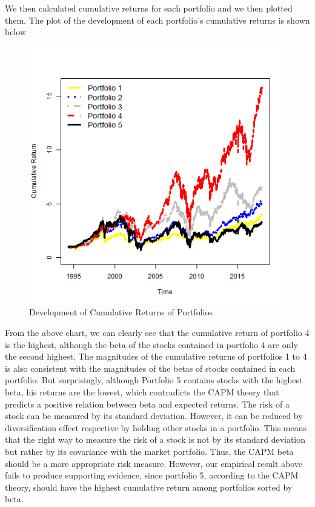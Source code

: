 \documentclass[12pt,a4paper]{article}
\begin{document}
\begin{justify}
We then calculated cumulative returns for each portfolio and we then plotted them. The plot of the development of each portfolio’s cumulative returns is shown below
\begin{figure}[H]
\centering
\includegraphics[width=1\textwidth,height=0.8\textwidth]{Cumulative Returns}
\caption{Development of Cumulative Returns of Portfolios}
\label{fig:Development of Cumulative Returns of Portfolios}
\end{figure}




From the above chart, we can clearly see that the cumulative return of portfolio 4 is the highest, although the beta of the stocks contained in portfolio 4 are only the second highest. The magnitudes of the cumulative returns of portfolios 1 to 4 is also consistent with the magnitudes of the betas of stocks contained in each portfolio. But surprisingly, although Portfolio 5 contains stocks with the highest beta, his returns are the lowest, which contradicts the CAPM theory that predicts a positive relation between beta and expected returns.
The risk of a stock can be measured by its standard deviation. However, it can be reduced by diversification effect respective by holding other stocks in a portfolio. This means that the right way to measure the risk of a stock is not by its standard deviation but rather by its covariance with the market portfolio. Thus, the CAPM beta should be a more appropriate risk measure.  However, our empirical result above fails to produce supporting evidence,  since portfolio 5, according to the CAPM theory, should have the highest cumulative return among portfolios sorted by beta.


\end{justify}
\end{document}
